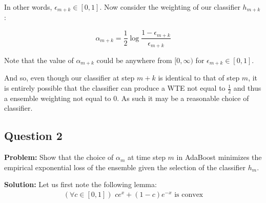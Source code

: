 \documentclass{article}
\begin{document}
In other words, $\epsilon_{m+k}\in[0,1]$. Now consider the weighting of our classifier $h_{m+k}$:

$$\alpha_{m+k}=\frac{1}{2}\log\frac{1-\epsilon_{m+k}}{\epsilon_{m+k}}$$

Note that the value of $\alpha_{m+k}$ could be anywhere from $[0,\infty)$ for $\epsilon_{m+k}\in[0,1]$.
\bigskip

And so, even though our classifier at step $m+k$ is identical to that of step $m$, it is entirely possible that the classifier can produce a WTE not equal to $\frac{1}{2}$ and thus a ensemble weighting not equal to 0. As such it may be a reasonable choice of classifier.

\subsection*{Question 2}
\noindent\textbf{Problem:} Show that the choice of $\alpha_m$ at time step $m$ in AdaBoost minimizes the empirical exponential loss of the ensemble given the selection of the classifier $h_m$.
\bigskip

\noindent\textbf{Solution:} Let us first note the following lemma:
\begin{align*}
  (\forall c\in[0,1])\,\,ce^x+(1-c)e^{-x}\text{ is convex}\tag{lemma 3}
\end{align*}
\end{document}
